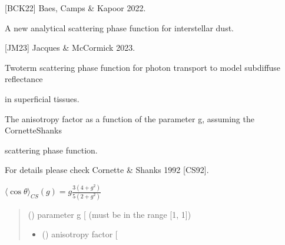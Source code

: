 \documentclass[letterpaper,10pt,english]{sphinxmanual}
\begin{document}
\begin{DUlineblock}{0em}
\item[] {[}BCK22{]} Baes, Camps \& Kapoor 2022.
\item[] A new analytical scattering phase function for interstellar dust.
\item[] 
\end{DUlineblock}

\begin{DUlineblock}{0em}
\item[] {[}JM23{]} Jacques \& McCormick 2023.
\item[] Two\sphinxhyphen{}term scattering phase function for photon transport to model subdiffuse reflectance
\item[] in superficial tissues.
\item[] 
\end{DUlineblock}

\begin{fulllineitems}
\label{\detokenize{06_anisotropy_factor:skinoptics.anisotropy_factor.costheta_CS}}
\pysigstartsignatures
{}
\pysigstopsignatures
\begin{DUlineblock}{0em}
\item[] The anisotropy factor as a function of the parameter g, assuming the Cornette\sphinxhyphen{}Shanks
\item[] scattering phase function.
\item[] For details please check Cornette \& Shanks 1992 {[}CS92{]}.
\end{DUlineblock}

\sphinxAtStartPar
\(\langle \cos\theta \rangle_{CS}(g) = g\frac{3(4 + g^2)}{5(2 + g^2)}\)
\begin{quote}\begin{description}
\sphinxAtStartPar
{} () \textendash{} parameter g {[}\sphinxhyphen{}{]} (must be in the range {[}\sphinxhyphen{}1, 1{]})

\sphinxAtStartPar
\begin{itemize}
\item {} 
\sphinxAtStartPar
{} () \textendash{} anisotropy factor {[}\sphinxhyphen{}{]}

\end{itemize}


\end{description}\end{quote}

\end{fulllineitems}
\end{document}
